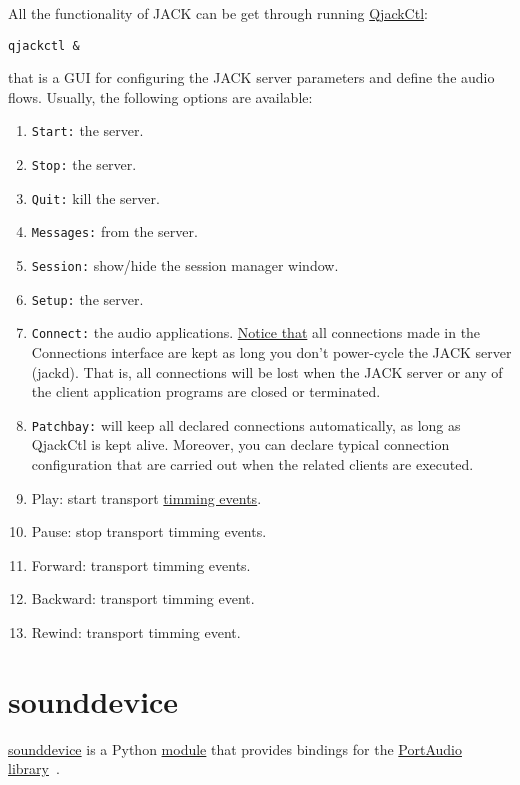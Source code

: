 All the functionality of JACK can be get through running
\href{https://qjackctl.sourceforge.io/}{QjackCtl}:
\begin{verbatim}
qjackctl &
\end{verbatim}
that is a GUI for configuring the JACK server parameters and define the audio flows. Usually, the following options are available:
\begin{enumerate}
\item \texttt{Start:} the server.
\item \texttt{Stop:} the server.
\item \texttt{Quit:} kill the server.
\item \texttt{Messages:} from the server.
\item \texttt{Session:} show/hide the session manager window.
\item \texttt{Setup:} the server. 
\item \texttt{Connect:} the audio
  applications. \href{http://www.rncbc.org/drupal/node/76}{Notice
    that} all connections made in the Connections interface are kept
  as long you don't power-cycle the JACK server (jackd). That is, all
  connections will be lost when the JACK server or any of the client
  application programs are closed or terminated.
\item \texttt{Patchbay:} will keep all declared connections
  automatically, as long as QjackCtl is kept alive. Moreover, you can
  declare typical connection configuration that are carried out when
  the related clients are executed.
\item Play: start transport
  \href{https://jackaudio.org/api/group__MIDIAPI.html}{timming
    events}.
\item Pause: stop transport timming events.
\item Forward: transport timming events.
\item Backward: transport timming event.
\item Rewind: transport timming event.
\end{enumerate}

\section{sounddevice}
\href{https://python-sounddevice.readthedocs.io}{sounddevice} is a
Python \href{https://docs.python.org/3/tutorial/modules.html}{module}
that provides bindings for the
\href{http://www.portaudio.com/}{PortAudio
  library}~\cite{sounddevice}.

